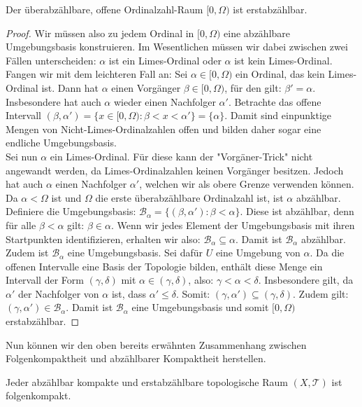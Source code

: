 \documentclass[11pt]{scrartcl}
\begin{document}
\begin{theorem}\label{UOOSfirstcountable}
	Der überabzählbare, offene Ordinalzahl-Raum $[0,\Omega)$ ist erstabzählbar.
\end{theorem}
\begin{proof}
	Wir müssen also zu jedem Ordinal in $[0,\Omega)$ eine abzählbare Umgebungsbasis konstruieren. Im Wesentlichen müssen wir dabei zwischen zwei
	Fällen unterscheiden: $\alpha$ ist ein Limes-Ordinal oder $\alpha$ ist kein Limes-Ordinal.\\
	Fangen wir mit dem leichteren Fall an: Sei $\alpha\in [0,\Omega)$ ein Ordinal, das kein Limes-Ordinal ist. Dann hat $\alpha$ einen Vorgänger $\beta \in [0,\Omega)$,
	für den gilt: $\beta'=\alpha$. Insbesondere hat auch $\alpha$ wieder einen Nachfolger $\alpha'$. Betrachte das offene Intervall $(\beta,\alpha')=\{x\in[0,\Omega): \beta < x <\alpha'\}
	= \{\alpha\}$. Damit sind einpunktige Mengen von Nicht-Limes-Ordinalzahlen offen und bilden daher sogar eine endliche Umgebungsbasis. \\
	Sei nun $\alpha$ ein Limes-Ordinal. Für diese kann der "Vorgäner-Trick" nicht angewandt werden, da Limes-Ordinalzahlen keinen Vorgänger besitzen. Jedoch hat auch $\alpha$ einen Nachfolger
	$\alpha'$, welchen wir als obere Grenze verwenden können. Da $\alpha < \Omega$ ist und $ \Omega $ die erste überabzählbare Ordinalzahl ist, ist $\alpha$ abzählbar. Definiere die Umgebungsbasis:
	$\mathcal B_\alpha = \{(\beta, \alpha'): \beta <\alpha\}$. Diese ist abzählbar, denn für alle $\beta < \alpha$ gilt: $\beta \in \alpha$. Wenn wir jedes Element der Umgebungsbasis mit ihren Startpunkten
	identifizieren, erhalten wir also: $\mathcal B_\alpha \subseteq \alpha$. Damit ist $\mathcal B_\alpha$ abzählbar.\\
	Zudem ist $\mathcal B_\alpha$ eine Umgebungsbasis. Sei dafür $U$ eine Umgebung von $\alpha$. Da die offenen Intervalle eine Basis der Topologie bilden, enthält diese Menge ein
	Intervall der Form $(\gamma, \delta)$ mit $\alpha \in (\gamma, \delta)$, also: $\gamma < \alpha < \delta$. Insbesondere gilt, da $\alpha'$ der Nachfolger von $\alpha$ ist, dass
	$\alpha' \leq \delta$. Somit: $(\gamma, \alpha')\subseteq (\gamma, \delta)$. Zudem gilt: $(\gamma,\alpha')\in \mathcal B_\alpha$. Damit ist $\mathcal B_\alpha$ eine Umgebungsbasis und somit
	$[0,\Omega)$ erstabzählbar.
\end{proof}
Nun können wir den oben bereits erwähnten Zusammenhang zwischen Folgenkompaktheit und abzählbarer 
Kompaktheit herstellen.
\begin{theorem}\label{CCandFCIsSC}
	Jeder abzählbar kompakte und erstabzählbare topologische Raum $(X,\mathcal T)$ ist folgenkompakt.
\end{theorem}
\end{document}
